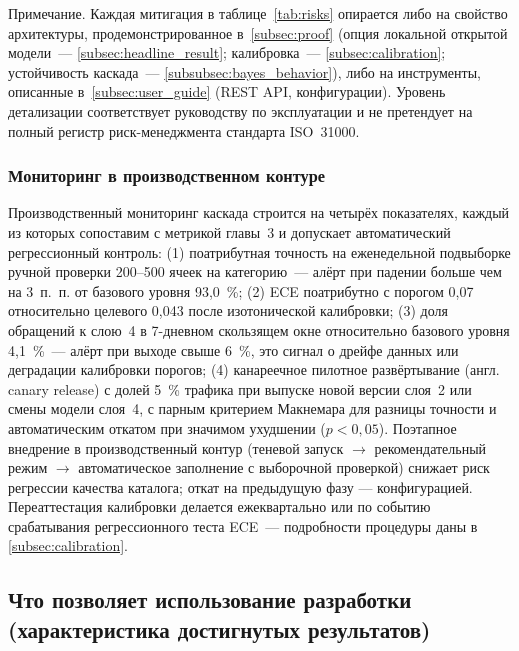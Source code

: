 Примечание. Каждая митигация в таблице~\ref{tab:risks} опирается либо на свойство архитектуры, продемонстрированное в~\ref{subsec:proof} (опция локальной открытой модели~--- \ref{subsec:headline_result}; калибровка~--- \ref{subsec:calibration}; устойчивость каскада~--- \ref{subsubsec:bayes_behavior}), либо на инструменты, описанные в~\ref{subsec:user_guide} (REST API, конфигурации). Уровень детализации соответствует руководству по эксплуатации и не претендует на полный регистр риск-менеджмента стандарта ISO~31000.

\subsubsection{Мониторинг в производственном контуре}

Производственный мониторинг каскада строится на четырёх показателях, каждый из которых сопоставим с метрикой главы~3 и допускает автоматический регрессионный контроль: (1) поатрибутная точность на еженедельной подвыборке ручной проверки 200--500 ячеек на категорию~--- алёрт при падении больше чем на 3~п.~п. от базового уровня 93{,}0~\%; (2) ECE поатрибутно с порогом 0{,}07 относительно целевого 0{,}043 после изотонической калибровки; (3) доля обращений к слою~4 в 7-дневном скользящем окне относительно базового уровня 4{,}1~\%~--- алёрт при выходе свыше 6~\%, это сигнал о дрейфе данных или деградации калибровки порогов; (4) канареечное пилотное развёртывание (англ. canary release) с долей 5~\% трафика при выпуске новой версии слоя~2 или смены модели слоя~4, с парным критерием Макнемара для разницы точности и автоматическим откатом при значимом ухудшении ($p < 0{,}05$). Поэтапное внедрение в производственный контур (теневой запуск $\to$ рекомендательный режим $\to$ автоматическое заполнение с выборочной проверкой) снижает риск регрессии качества каталога; откат на предыдущую фазу — конфигурацией. Переаттестация калибровки делается ежеквартально или по событию срабатывания регрессионного теста ECE~--- подробности процедуры даны в \ref{subsec:calibration}.

\subsection{Что позволяет использование разработки (характеристика достигнутых результатов)}

